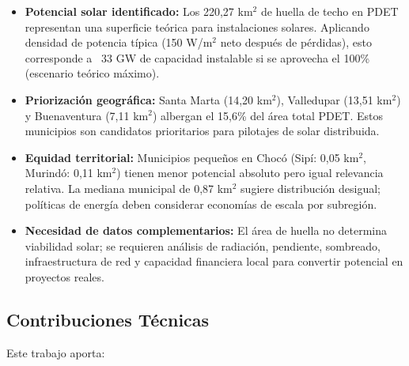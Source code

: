 \documentclass[11pt, a4paper]{article}
\begin{document}
\begin{itemize}
    \item \textbf{Potencial solar identificado:} Los 220,27 km$^2$ de huella de techo en PDET representan una superficie teórica para instalaciones solares. Aplicando densidad de potencia típica (150 W/m$^2$ neto después de pérdidas), esto corresponde a ~33 GW de capacidad instalable si se aprovecha el 100\% (escenario teórico máximo).

    \item \textbf{Priorización geográfica:} Santa Marta (14,20 km$^2$), Valledupar (13,51 km$^2$) y Buenaventura (7,11 km$^2$) albergan el 15,6\% del área total PDET. Estos municipios son candidatos prioritarios para pilotajes de solar distribuida.

    \item \textbf{Equidad territorial:} Municipios pequeños en Chocó (Sipí: 0,05 km$^2$, Murindó: 0,11 km$^2$) tienen menor potencial absoluto pero igual relevancia relativa. La mediana municipal de 0,87 km$^2$ sugiere distribución desigual; políticas de energía deben considerar economías de escala por subregión.

    \item \textbf{Necesidad de datos complementarios:} El área de huella no determina viabilidad solar; se requieren análisis de radiación, pendiente, sombreado, infraestructura de red y capacidad financiera local para convertir potencial en proyectos reales.
\end{itemize}

\subsection{Contribuciones Técnicas}

Este trabajo aporta:
\end{document}

